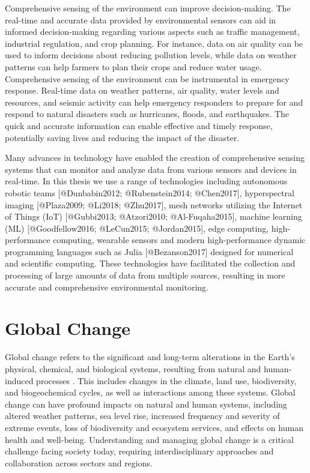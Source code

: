 Comprehensive sensing of the environment can improve decision-making. The real-time and accurate data provided by environmental sensors can aid in informed decision-making regarding various aspects such as traffic management, industrial regulation, and crop planning. For instance, data on air quality can be used to inform decisions about reducing pollution levels, while data on weather patterns can help farmers to plan their crops and reduce water usage. Comprehensive sensing of the environment can be instrumental in emergency response. Real-time data on weather patterns, air quality, water levels and resources, and seismic activity can help emergency responders to prepare for and respond to natural disasters such as hurricanes, floods, and earthquakes. The quick and accurate information can enable effective and timely response, potentially saving lives and reducing the impact of the disaster.

Many advances in technology have enabled the creation of comprehensive sensing systems that can monitor and analyze data from various sensors and devices in real-time. In this thesis we use a range of technologies including autonomous robotic teams [@Dunbabin2012; @Rubenstein2014; @Chen2017], hyperspectral imaging [@Plaza2009; @Li2018; @Zhu2017], mesh networks utilizing the Internet of Things (IoT) [@Gubbi2013; @Atzori2010; @Al-Fuqaha2015], machine learning (ML) [@Goodfellow2016; @LeCun2015; @Jordan2015], edge computing, high-performance computing,  wearable sensors and modern high-performance dynamic programming languages such as Julia [@Bezanson2017] designed for numerical and scientific computing. These technologies have facilitated the collection and processing of large amounts of data from multiple sources, resulting in more accurate and comprehensive environmental monitoring.


\section{Global Change}


Global change refers to the significant and long-term alterations in the Earth's physical, chemical, and biological systems, resulting from natural and human-induced processes \cite{IPCC2014, IPCC2018, UN2015}. This includes changes in the climate, land use, biodiversity, and biogeochemical cycles, as well as interactions among these systems. Global change can have profound impacts on natural and human systems, including altered weather patterns, sea level rise, increased frequency and severity of extreme events, loss of biodiversity and ecosystem services, and effects on human health and well-being. Understanding and managing global change is a critical challenge facing society today, requiring interdisciplinary approaches and collaboration across sectors and regions.

